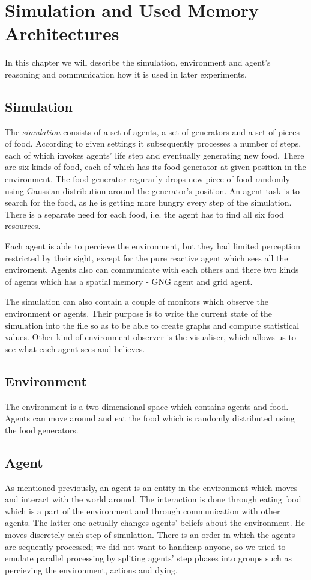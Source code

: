 \chapter{Simulation and Used Memory Architectures}

In this chapter we will describe the simulation, environment and agent's reasoning and communication how it is used in later experiments. 

\section{Simulation}

The \emph{simulation} consists of a set of agents, a set of generators and a set of pieces of food. According to given settings it subsequently processes a number of steps, each of which invokes agents' life step and eventually generating new food. There are six kinds of food, each of which has its food generator at given position in the environment. The food generator regurarly drops new piece of food randomly using Gaussian distribution around the generator's position. An agent task is to search for the food, as he is getting more hungry every step of the simulation. There is a separate need for each food, i.e. the agent has to find all six food resources. 

Each agent is able to percieve the environment, but they had limited perception restricted by their sight, except for the pure reactive agent which sees all the enviroment. Agents also can communicate with each others and there two kinds of agents which has a spatial memory - GNG agent and grid agent.

The simulation can also contain a couple of monitors which observe the environment or agents. Their purpose is to write the current state of the simulation into the file so as to be able to create graphs and compute statistical values. Other kind of environment observer is the visualiser, which allows us to see what each agent sees and believes.

\section{Environment}

The environment is a two-dimensional space which contains agents and food. Agents can move around and eat the food which is randomly distributed using the food generators. 

\section{Agent}                                                      
As mentioned previously, an agent is an entity in the environment which moves and interact with the world around. The interaction is done through eating food which is a part of the environment and through communication with other agents. The latter one actually changes agents' beliefs about the environment. He moves discretely each step of simulation. There is an order in which the agents are sequently processed; we did not want to handicap anyone, so we tried to emulate parallel processing by spliting agents' step phases into groups such as percieving the environment, actions and dying.


